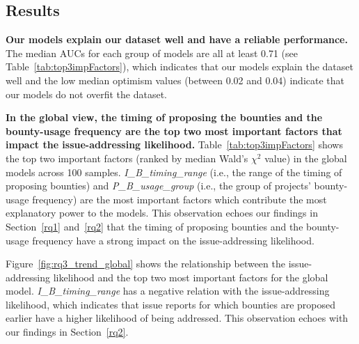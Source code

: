 \subsection{Results}
\textbf{Our models explain our dataset well and have a reliable performance.} The median AUCs for each group of models are all at least 0.71 (see Table~\ref{tab:top3impFactors}), which indicates that our models explain the dataset well and the low median optimism values (between 0.02 and 0.04) indicate that our models do not overfit the dataset.

\textbf{In the global view, the timing of proposing the bounties and the bounty-usage frequency are the top two most important factors that impact the issue-addressing likelihood.} Table~\ref{tab:top3impFactors} shows the top two important factors (ranked by median Wald's $\chi^2$ value) in the global models across 100 samples.
\textit{I\_B\_timing\_range} (i.e., the range of the timing of proposing bounties) and \textit{P\_B\_usage\_group} (i.e., the group of projects' bounty-usage frequency) are the most important factors which contribute the most explanatory power to the models. This observation echoes our findings in Section~\ref{rq1} and~\ref{rq2} that the timing of proposing bounties and the bounty-usage frequency have a strong impact on the issue-addressing likelihood.

Figure~\ref{fig:rq3_trend_global} shows the relationship between the issue-addressing likelihood and the top two most important factors for the global model. \textit{I\_B\_timing\_range} has a negative relation with the issue-addressing likelihood, which indicates that issue reports for which bounties are proposed earlier have a higher likelihood of being addressed. This observation echoes with our findings in Section~\ref{rq2}.


